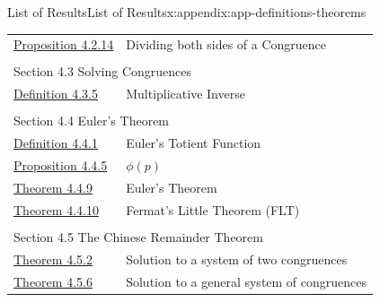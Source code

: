 \documentclass[oneside,10pt,]{book}
\numberwithin{equation}{section}
\begin{document}
\begin{appendixptx}{List of Results}{}{List of Results}{}{}{x:appendix:app-definitions-theorems}
\begin{longtable}[l]{ll}
\hyperref[x:proposition:prop-cong-division]{Proposition 4.2.14}& Dividing both sides of a Congruence\\
\multicolumn{2}{l}{\null}\\[1.5ex] \multicolumn{2}{l}{\large Section 4.3 Solving Congruences}\\[0.5ex]
\hyperref[x:definition:def-multiplicative-inverse]{Definition 4.3.5}& Multiplicative Inverse\\
\multicolumn{2}{l}{\null}\\[1.5ex] \multicolumn{2}{l}{\large Section 4.4 Euler's Theorem}\\[0.5ex]
\hyperref[x:definition:def-euler-totient]{Definition 4.4.1}& Euler's Totient Function\\
\hyperref[x:proposition:prop-euler-totient-prime]{Proposition 4.4.5}& \(\phi(p)\)\\
\hyperref[x:theorem:thm-euler]{Theorem 4.4.9}& Euler's Theorem\\
\hyperref[x:theorem:thm-flt]{Theorem 4.4.10}& Fermat's Little Theorem (FLT)\\
\multicolumn{2}{l}{\null}\\[1.5ex] \multicolumn{2}{l}{\large Section 4.5 The Chinese Remainder Theorem}\\[0.5ex]
\hyperref[x:theorem:thm-crt-2]{Theorem 4.5.2}& Solution to a system of two congruences\\
\hyperref[x:theorem:thm-crt-n]{Theorem 4.5.6}& Solution to a general system of congruences\\
\end{longtable}
\end{appendixptx}
%
%
\typeout{************************************************}
\typeout{************************************************}
%
\end{document}
